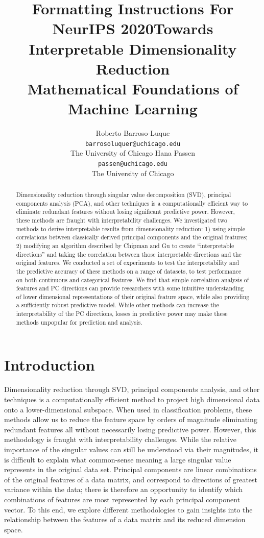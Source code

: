 \documentclass{article}
\title{Formatting Instructions For NeurIPS 2020}
\title{Towards Interpretable Dimensionality Reduction\\
	\large Mathematical Foundations of Machine Learning}
\author{Roberto Barroso-Luque \\
	\texttt{barrosoluquer@uchicago.edu}  \\
	The University of Chicago
	\AND
	Hana Passen\\
	\texttt{passen@uchicago.edu} \\
    The University of Chicago\\}
\begin{document}
\maketitle

\begin{abstract}
Dimensionality reduction through singular value decomposition (SVD), principal components analysis (PCA), and other techniques is a computationally efficient way to eliminate redundant features without losing significant predictive power. However, these methods are fraught with interpretability challenges. We investigated two methods to derive interpretable results from dimensionality reduction: 1) using simple correlations between classically derived principal components and the original features; 2) modifying an algorithm described by Chipman and Gu to create “interpretable directions” and taking the correlation between those interpretable directions and the original features. We conducted a set of experiments to test the interpretability and the predictive accuracy of these methods on a range of datasets, to test performance on both continuous and categorical features. We find that simple correlation analysis of features and PC directions can provide researchers with some intuitive understanding of lower dimensional representations of their original feature space, while also providing a sufficiently robust predictive model. While other methods can increase the interpretability of the PC directions, losses in predictive power may make these methods unpopular for prediction and analysis.  
\end{abstract}
\pagebreak

\section{Introduction}
Dimensionality reduction through SVD, principal components analysis, and other techniques is a computationally efficient method to project high dimensional data onto a lower-dimensional subspace. When used in classification problems, these methods allow us to reduce the feature space by orders of magnitude eliminating redundant features all without necessarily losing predictive power. However, this methodology is fraught with interpretability challenges. While the relative importance of the singular values can still be understood via their magnitudes, it is difficult to explain what common-sense meaning a large singular value represents in the original data set. Principal components are linear combinations of the original features of a data matrix, and correspond to directions of greatest variance within the data; there is therefore an opportunity to identify which combinations of features are most represented by each principal component vector. To this end, we explore different methodologies to gain insights into the relationship between the features of a data matrix and its reduced dimension space.
\end{document}
